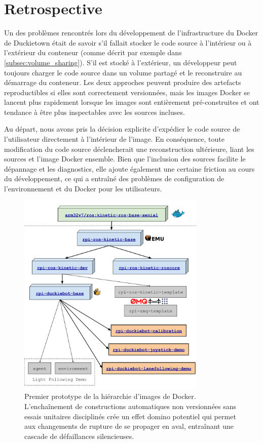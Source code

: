 \section{Retrospective}\label{sec:retrospective}

Un des problèmes rencontrés lors du développement de l'infrastructure du Docker de Duckietown était de savoir s'il fallait stocker le code source à l'intérieur ou à l'extérieur du conteneur (comme décrit par exemple dans \autoref{subsec:volume_sharing}). S'il est stocké à l'extérieur, un développeur peut toujours charger le code source dans un volume partagé et le reconstruire au démarrage du conteneur. Les deux approches peuvent produire des artefacts reproductibles si elles sont correctement versionnées, mais les images Docker se lancent plus rapidement lorsque les images sont entièrement pré-construites et ont tendance à être plus inspectables avec les sources incluses.

Au départ, nous avons pris la décision explicite d'expédier le code source de l'utilisateur directement à l'intérieur de l'image. En conséquence, toute modification du code source déclencherait une reconstruction ultérieure, liant les sources et l'image Docker ensemble. Bien que l'inclusion des sources facilite le dépannage et les diagnostics, elle ajoute également une certaine friction au cours du développement, ce qui a entraîné des problèmes de configuration de l'environnement et du Docker pour les utilisateurs.

\begin{figure}
\includegraphics[width=0.80\textwidth]{../figures/image_provenance.png}
\caption{Premier prototype de la hiérarchie d'images de Docker. L'enchaînement de constructions automatiques non versionnées sans essais unitaires disciplinés crée un effet domino potentiel qui permet aux changements de rupture de se propager en aval, entraînant une cascade de défaillances silencieuses.}
\label{fig:early_prototype}
\end{figure}

